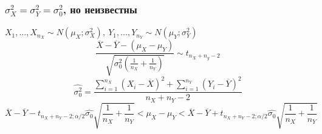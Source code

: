 \documentclass[a4paper, 10pt]{article}
\begin{document}
\subsubsection{$\sigma^2_X=\sigma^2_Y=\sigma^2_0$, но неизвестны}
$X_1,\ldots,X_{n_X}\sim N(\mu_X;\sigma^2_X),\ Y_1,\ldots,Y_{n_Y}\sim N(\mu_Y;\sigma^2_Y)$
\begin{equation*}
    \frac{\overline{X}-\overline{Y}-(\mu_X-\mu_Y)}{\sqrt{\sigma^2_0\left(\frac{1}{n_X}+\frac{1}{n_Y}\right)}}\sim t_{n_X+n_y-2}
\end{equation*}
\begin{equation*}
    \widehat{\sigma^2_0}=\frac{\sum_{i=1}^{n_X}\left(X_i-\overline{X}\right)^2+\sum_{i=1}^{n_Y}\left(Y_i-\overline{Y}\right)^2}{n_X+n_Y-2}
\end{equation*}
\begin{equation*}
    \overline{X}-\overline{Y}-t_{n_X+n_Y-2;\alpha/2}\widehat{\sigma_0}\sqrt{\frac{1}{n_X}+\frac{1}{n_Y}}<\mu_X-\mu_Y<\overline{X}-\overline{Y}+t_{n_X+n_Y-2;\alpha/2}\widehat{\sigma_0}\sqrt{\frac{1}{n_X}+\frac{1}{n_Y}}
\end{equation*}
\end{document}
